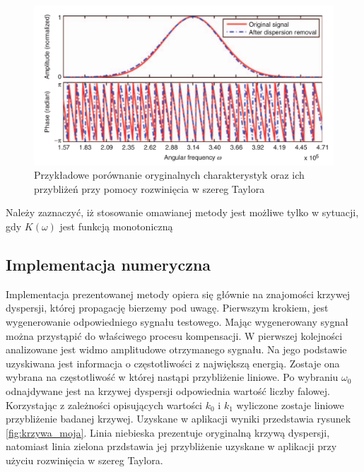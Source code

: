 \begin{figure}[h]
\centering
\includegraphics[width=14cm]{Zdjecia/4/widma}
\caption{Przykładowe porównanie oryginalnych charakterystyk oraz ich przybliżeń przy pomocy rozwinięcia w szereg Taylora \cite{kasia5}}
\label{fig:widma}
\end{figure}

Należy zaznaczyć, iż stosowanie omawianej metody jest możliwe tylko w sytuacji, gdy $K(\omega)$ jest funkcją monotoniczną

\subsection{Implementacja numeryczna}
Implementacja prezentowanej metody opiera się głównie na znajomości krzywej dyspersji, której propagację bierzemy pod uwagę. Pierwszym krokiem, jest wygenerowanie odpowiedniego sygnału testowego. Mając wygenerowany sygnał można przystąpić do właściwego procesu kompensacji. W pierwszej kolejności analizowane jest widmo amplitudowe otrzymanego sygnału. Na jego podstawie uzyskiwana jest informacja o częstotliwości z największą energią. Zostaje ona wybrana na częstotliwość w której nastąpi przybliżenie liniowe. Po wybraniu $\omega _0$ odnajdywane jest na krzywej dyspersji odpowiednia wartość liczby falowej. Korzystając z zależności opisujących wartości $k_0$ i $k_1$ wyliczone zostaje liniowe przybliżenie badanej krzywej. Uzyskane w aplikacji wyniki przedstawia rysunek \ref{fig:krzywa_moja}. Linia niebieska prezentuje oryginalną krzywą dyspersji, natomiast linia zielona przdstawia jej przybliżenie uzyskane w aplikacji przy użyciu rozwinięcia w szereg Taylora.

